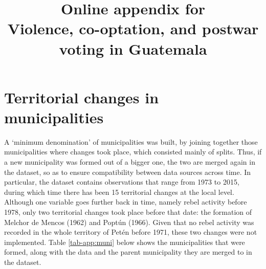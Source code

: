 \documentclass[a4paper, 12pt, notitlepage]{article}
\title{\Large Online appendix for\\Violence, co-optation, and postwar voting in Guatemala}
\author{}%
\date{}
\begin{document}
\maketitle

\tableofcontents


\clearpage
\section{Territorial changes in municipalities}

A `minimum denomination' of municipalities was built, by joining together those municipalities where changes took place, which consisted mainly of splits.
Thus, if a new municipality was formed out of a bigger one, the two are merged again in the dataset, so as to ensure compatibility between data sources across time.
In particular, the dataset contains observations that range from 1973 to 2015, during which time there has been 15 territorial changes at the local level.
Although one variable goes further back in time, namely rebel activity before 1978, only two territorial changes took place before that date: the formation of Melchor de Mencos (1962) and Poptún (1966).%
Given that no rebel activity was recorded in the whole territory of Petén before 1971, these two changes were not implemented.
Table \ref{tab-app:muni} below shows the municipalities that were formed, along with the data and the parent municipality they are merged to in the dataset.
\end{document}
